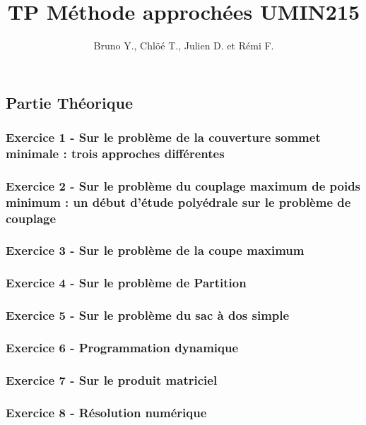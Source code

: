\documentclass{article}
\title{TP Méthode approchées UMIN215}
\author{Bruno Y., Chlöé T., Julien D. et Rémi F.}
\begin{document}
\maketitle

\subsection*{Partie Théorique}

\subsubsection*{Exercice 1 - Sur le problème de la couverture sommet minimale : trois approches différentes}

\subsubsection*{Exercice 2 - Sur le problème du couplage maximum de poids minimum : un début d'étude polyédrale sur le problème de couplage}

\subsubsection*{Exercice 3 - Sur le problème de la coupe maximum}

\subsubsection*{Exercice 4 - Sur le problème de Partition}

\subsubsection*{Exercice 5 - Sur le problème du sac à dos simple}

\subsubsection*{Exercice 6 - Programmation dynamique}

\subsubsection*{Exercice 7 - Sur le produit matriciel}

\subsubsection*{Exercice 8 - Résolution numérique}
\end{document}
